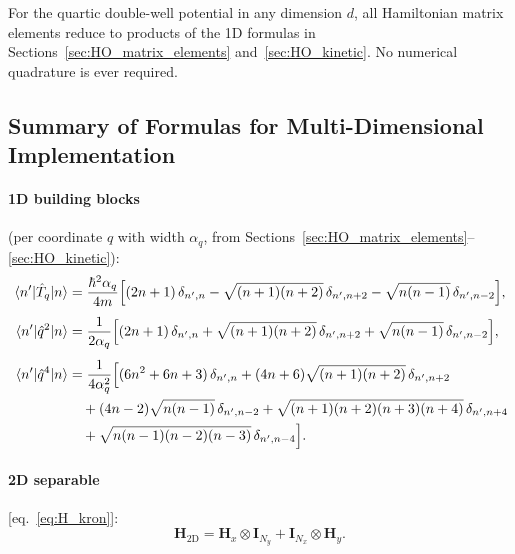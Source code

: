 \begin{remark}
For the quartic double-well potential in any dimension $d$, all Hamiltonian
matrix elements reduce to products of the 1D formulas in
Sections~\ref{sec:HO_matrix_elements} and~\ref{sec:HO_kinetic}.  No
numerical quadrature is ever required.
\end{remark}

\subsection{Summary of Formulas for Multi-Dimensional
Implementation}\label{sec:summary_multidim}

\paragraph{1D building blocks} (per coordinate $q$ with width $\alpha_q$, from
Sections~\ref{sec:HO_matrix_elements}--\ref{sec:HO_kinetic}):
\begin{align}
    \mel{n'}{\hat{T}_q}{n} &= \frac{\hbar^2\alpha_q}{4m}
    \Bigl[(2n+1)\,\delta_{n',n} - \sqrt{(n+1)(n+2)}\,\delta_{n',n+2}
    - \sqrt{n(n-1)}\,\delta_{n',n-2}\Bigr],
    \label{eq:summary_T_md} \\[4pt]
    \mel{n'}{\hat{q}^2}{n} &= \frac{1}{2\alpha_q}
    \Bigl[(2n+1)\,\delta_{n',n} + \sqrt{(n+1)(n+2)}\,\delta_{n',n+2}
    + \sqrt{n(n-1)}\,\delta_{n',n-2}\Bigr],
    \label{eq:summary_q2_md} \\[4pt]
    \mel{n'}{\hat{q}^4}{n} &= \frac{1}{4\alpha_q^2}
    \Bigl[(6n^2+6n+3)\,\delta_{n',n}
    + (4n+6)\sqrt{(n+1)(n+2)}\,\delta_{n',n+2}
    \notag\\
    &\quad+ (4n-2)\sqrt{n(n-1)}\,\delta_{n',n-2}
    + \sqrt{(n+1)(n+2)(n+3)(n+4)}\,\delta_{n',n+4}
    \notag\\
    &\quad+ \sqrt{n(n-1)(n-2)(n-3)}\,\delta_{n',n-4}
    \Bigr].
    \label{eq:summary_q4_md}
\end{align}

\paragraph{2D separable} [eq.~\eqref{eq:H_kron}]:
\begin{equation*}
    \mathbf{H}_\mathrm{2D} = \mathbf{H}_x \otimes \mathbf{I}_{N_y}
    + \mathbf{I}_{N_x} \otimes \mathbf{H}_y.
\end{equation*}


